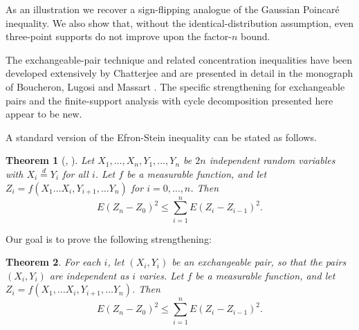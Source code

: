 \documentclass[letterpaper, 12pt]{article}
\theoremstyle{plain}
\newtheorem{theorem}{Theorem}
\theoremstyle{definition}
\theoremstyle{remark}
\begin{document}
As an illustration we recover a sign-flipping analogue of the Gaussian Poincaré inequality. We also show that, without the identical-distribution assumption, even three-point supports do not improve upon the factor-\(n\) bound.

The exchangeable-pair technique and related concentration inequalities have been developed extensively by Chatterjee \cite{chatterjee2007stein} and are presented in detail in the monograph of Boucheron, Lugosi and Massart \cite{boucheron2013concentration}. The specific strengthening for exchangeable pairs and the finite-support analysis with cycle decomposition presented here appear to be new.


A standard version of the Efron-Stein inequality can be stated as follows.
\begin{theorem}[\cite{efron1981jackknife}, \cite{steele1986efron}]\label{thm: efron-stein}
Let \(X_1,\ldots, X_n,Y_1,\ldots,Y_n\) be \(2n\) independent random variables with \(X_i\stackrel{d}{=} Y_i\) for all \(i\). Let \(f\) be a measurable function, and let \(Z_i=f(X_1\ldots X_{i},Y_{i+1},\ldots Y_n)\) for \(i=0,\dots,n\). Then
$$
E(Z_n-Z_0)^2\le \sum_{i=1}^n E(Z_i-Z_{i-1})^2.
$$
\end{theorem}

Our goal is to prove the following strengthening:
\begin{theorem}\label{thm: Efron-Stein for exchangeable pair}
For each \(i\), let \((X_i,Y_i)\) be an exchangeable pair, so that the pairs \((X_i,Y_i)\) are independent as \(i\) varies. Let \(f\) be a measurable function, and let \(Z_i=f(X_1,\ldots X_{i},Y_{i+1},\ldots Y_n)\). Then
$$
E(Z_n-Z_0)^2\le \sum_{i=1}^n E(Z_i-Z_{i-1})^2.
$$
\end{theorem}
\end{document}
